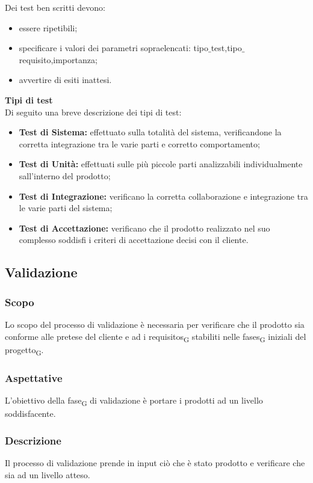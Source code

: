     Dei test ben scritti devono:
    \begin{itemize}
    	\item essere ripetibili;
    	\item specificare i valori dei parametri sopraelencati: tipo$\_$test,tipo$\_$requisito,importanza;
    	\item avvertire di esiti inattesi.
    \end{itemize}
	\textbf{Tipi di test}\\
	Di seguito una breve descrizione dei tipi di test:
	\begin{itemize}
		\item \textbf{Test di Sistema:} effettuato sulla totalità del sistema, verificandone la corretta integrazione tra le varie parti e corretto comportamento;
		\item \textbf{Test di Unità:} effettuati sulle più piccole parti analizzabili individualmente sall'interno del prodotto;
		\item \textbf{Test di Integrazione:} verificano la corretta collaborazione e integrazione tra le varie parti del sistema;
		\item \textbf{Test di Accettazione:} verificano che il prodotto realizzato nel suo complesso soddisfi i criteri di accettazione decisi con il cliente.
	\end{itemize}
\subsection{Validazione} 
    \subsubsection{Scopo}
    Lo scopo del processo di validazione è necessaria per verificare che il prodotto sia conforme alle pretese del cliente e ad i \glspl{requisito}\textsubscript{G} stabiliti nelle \glspl{fase}\textsubscript{G} iniziali del \gls{progetto}\textsubscript{G}.
    \subsubsection{Aspettative}
    L'obiettivo della \gls{fase}\textsubscript{G} di validazione è portare i prodotti ad un livello soddisfacente.
    \subsubsection{Descrizione}
    Il processo di validazione prende in input ciò che è stato prodotto e verificare che sia ad un livello atteso.
